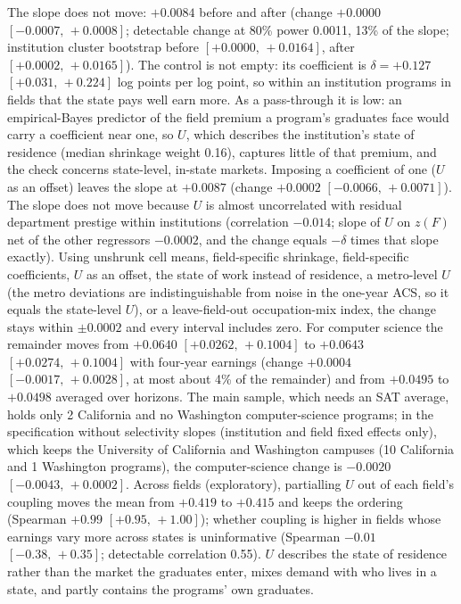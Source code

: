 \documentclass[11pt]{article}
\newcommand{\ci}[2]{$[#1,\allowbreak\,#2]$}
\begin{document}
The slope does not move: $+0.0084$ before and after (change $+0.0000$ \ci{-0.0007}{+0.0008}; detectable change at
80\% power 0.0011, 13\% of the slope; institution cluster bootstrap before \ci{+0.0000}{+0.0164}, after
\ci{+0.0002}{+0.0165}). The control is not empty: its coefficient is $\delta=+0.127$ \ci{+0.031}{+0.224} log points
per log point, so within an institution programs in fields that the state pays well earn more. As a pass-through
it is low: an empirical-Bayes predictor of the field premium a program's graduates face would carry a coefficient
near one, so $U$, which describes the institution's state of residence (median shrinkage weight 0.16), captures
little of that premium, and the check concerns state-level, in-state markets. Imposing a coefficient of one ($U$ as
an offset) leaves the slope at $+0.0087$ (change $+0.0002$ \ci{-0.0066}{+0.0071}). The slope does not
move because $U$ is almost uncorrelated with residual department prestige within institutions (correlation
$-0.014$; slope of $U$ on $z(F)$ net of the other regressors $-0.0002$, and the change equals $-\delta$ times that
slope exactly). Using unshrunk cell means, field-specific shrinkage, field-specific coefficients, $U$ as an offset,
the state of work instead of residence, a metro-level $U$ (the metro deviations are indistinguishable from noise in
the one-year ACS, so it equals the state-level $U$), or a leave-field-out occupation-mix index, the change stays
within $\pm0.0002$ and every interval includes zero. For computer science the remainder moves from $+0.0640$
\ci{+0.0262}{+0.1004} to $+0.0643$ \ci{+0.0274}{+0.1004} with four-year earnings (change $+0.0004$
\ci{-0.0017}{+0.0028}, at most about 4\% of the remainder) and from $+0.0495$ to $+0.0498$ averaged over horizons.
The main sample, which needs an SAT average, holds only 2 California and no Washington computer-science programs;
in the specification without selectivity slopes (institution and field fixed effects only), which keeps the
University of California and Washington campuses (10 California and 1 Washington programs), the computer-science
change is $-0.0020$ \ci{-0.0043}{+0.0002}. Across fields (exploratory), partialling $U$ out of each field's coupling
moves the mean from $+0.419$ to $+0.415$ and keeps the ordering (Spearman $+0.99$ \ci{+0.95}{+1.00}); whether
coupling is higher in fields whose earnings vary more across states is uninformative (Spearman $-0.01$
\ci{-0.38}{+0.35}; detectable correlation 0.55). $U$ describes the state of residence rather than the market the
graduates enter, mixes demand with who lives in a state, and partly contains the programs' own graduates.
\end{document}
